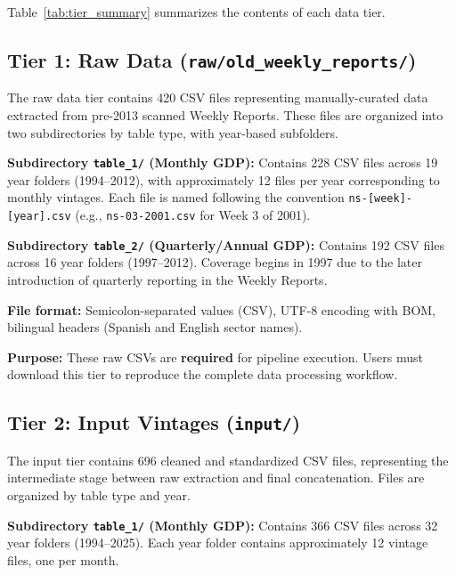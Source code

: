 \documentclass[12pt]{article}
\begin{document}
Table~\ref{tab:tier_summary} summarizes the contents of each data tier.

\setcounter{table}{0}

\begin{table}[h]
\centering
\caption{Dataset tier summary}
\label{tab:tier_summary}

\resizebox{\textwidth}{!}{%

}

\end{table}

\subsection*{Tier 1: Raw Data (\texttt{raw/old\_weekly\_reports/})}

The raw data tier contains 420 CSV files representing manually-curated data extracted from pre-2013 scanned Weekly Reports. These files are organized into two subdirectories by table type, with year-based subfolders.

\textbf{Subdirectory \texttt{table\_1/} (Monthly GDP):} Contains 228 CSV files across 19 year folders (1994--2012), with approximately 12 files per year corresponding to monthly vintages. Each file is named following the convention \texttt{ns-[week]-[year].csv} (e.g., \texttt{ns-03-2001.csv} for Week 3 of 2001).

\textbf{Subdirectory \texttt{table\_2/} (Quarterly/Annual GDP):} Contains 192 CSV files across 16 year folders (1997--2012). Coverage begins in 1997 due to the later introduction of quarterly reporting in the Weekly Reports.

\textbf{File format:} Semicolon-separated values (CSV), UTF-8 encoding with BOM, bilingual headers (Spanish and English sector names).

\textbf{Purpose:} These raw CSVs are \textbf{required} for pipeline execution. Users must download this tier to reproduce the complete data processing workflow.

\subsection*{Tier 2: Input Vintages (\texttt{input/})}

The input tier contains 696 cleaned and standardized CSV files, representing the intermediate stage between raw extraction and final concatenation. Files are organized by table type and year.

\textbf{Subdirectory \texttt{table\_1/} (Monthly GDP):} Contains 366 CSV files across 32 year folders (1994--2025). Each year folder contains approximately 12 vintage files, one per month.
\end{document}
